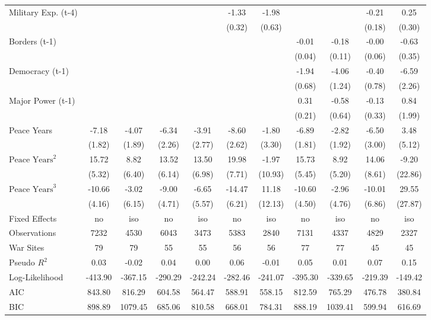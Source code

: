 \begin{tabular}{lcccccccccc}
Military Exp. (t-4) &  &  &  &  & -1.33 & -1.98 &  &  & -0.21 & 0.25 \\
&  &  &  &  & (0.32) & (0.63) &  &  & (0.18) & (0.30) \\
Borders (t-1) &  &  &  &  &  &  & -0.01 & -0.18 & -0.00 & -0.63 \\
&  &  &  &  &  &  & (0.04) & (0.11) & (0.06) & (0.35) \\
Democracy (t-1) &  &  &  &  &  &  & -1.94 & -4.06 & -0.40 & -6.59 \\
&  &  &  &  &  &  & (0.68) & (1.24) & (0.78) & (2.26) \\
Major Power (t-1) &  &  &  &  &  &  & 0.31 & -0.58 & -0.13 & 0.84 \\
&  &  &  &  &  &  & (0.21) & (0.64) & (0.33) & (1.99) \\
Peace Years & -7.18 & -4.07 & -6.34 & -3.91 & -8.60 & -1.80 & -6.89 & -2.82 & -6.50 & 3.48 \\
& (1.82) & (1.89) & (2.26) & (2.77) & (2.62) & (3.30) & (1.81) & (1.92) & (3.00) & (5.12) \\
$\text{Peace Years}^2$ & 15.72 & 8.82 & 13.52 & 13.50 & 19.98 & -1.97 & 15.73 & 8.92 & 14.06 & -9.20 \\
& (5.32) & (6.40) & (6.14) & (6.98) & (7.71) & (10.93) & (5.45) & (5.20) & (8.61) & (22.86) \\
$\text{Peace Years}^3$ & -10.66 & -3.02 & -9.00 & -6.65 & -14.47 & 11.18 & -10.60 & -2.96 & -10.01 & 29.55 \\
& (4.16) & (6.15) & (4.71) & (5.57) & (6.21) & (12.13) & (4.50) & (4.76) & (6.86) & (27.87) \\
\midrule
Fixed Effects & no & iso & no & iso & no & iso & no & iso & no & iso \\
Observations & 7232 & 4530 & 6043 & 3473 & 5383 & 2840 & 7131 & 4337 & 4829 & 2327 \\
War Sites & 79 & 79 & 55 & 55 & 56 & 56 & 77 & 77 & 45 & 45 \\
Pseudo $R^2$ & 0.03 & -0.02 & 0.04 & 0.00 & 0.06 & -0.01 & 0.05 & 0.01 & 0.07 & 0.15 \\
Log-Likelihood & -413.90 & -367.15 & -290.29 & -242.24 & -282.46 & -241.07 & -395.30 & -339.65 & -219.39 & -149.42 \\
AIC & 843.80 & 816.29 & 604.58 & 564.47 & 588.91 & 558.15 & 812.59 & 765.29 & 476.78 & 380.84 \\
BIC & 898.89 & 1079.45 & 685.06 & 810.58 & 668.01 & 784.31 & 888.19 & 1039.41 & 599.94 & 616.69 \\
\bottomrule
\end{tabular}
